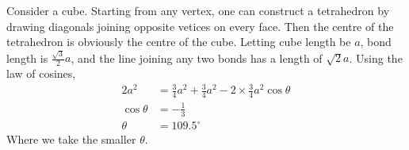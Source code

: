 \documentclass[answers]{exam}
\begin{document}
\begin{questions}
\begin{solution}
	Consider a cube. Starting from any vertex, one can construct a tetrahedron by drawing diagonals joining opposite vetices on every face. Then the centre of the tetrahedron is obviously the centre of the cube. Letting cube length be $a$, bond length is $\frac{\sqrt{3}}{2}a$, and the line joining any two bonds has a length of $\sqrt{2}a$. Using the law of cosines,
	\begin{align*}
		2a^2 &= \frac{3}{4}a^2 + \frac{3}{4}a^2 - 2\times\frac{3}{4}a^2\cos\theta \\
		\cos\theta &= -\frac{1}{3} \\
		\theta &= 109.5^\circ
	\end{align*}
	Where we take the smaller $\theta$.
\end{solution}

\end{questions}
\end{document}
